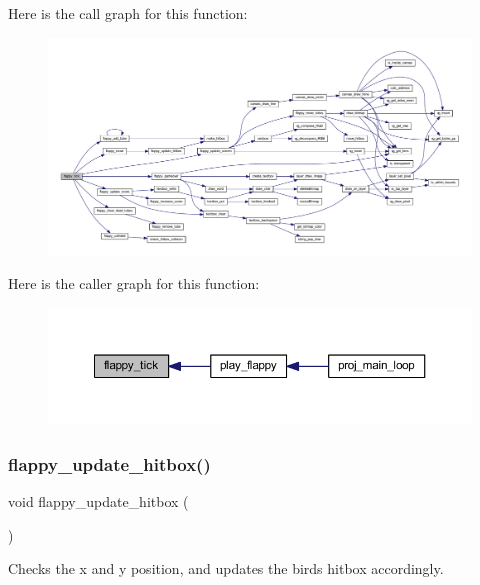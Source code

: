 Here is the call graph for this function\+:\nopagebreak
\begin{figure}[H]
\begin{center}
\leavevmode
\includegraphics[width=350pt]{group__flappy_ga8efa272248ce46f0bb6081dcb680598d_cgraph}
\end{center}
\end{figure}
Here is the caller graph for this function\+:\nopagebreak
\begin{figure}[H]
\begin{center}
\leavevmode
\includegraphics[width=350pt]{group__flappy_ga8efa272248ce46f0bb6081dcb680598d_icgraph}
\end{center}
\end{figure}
\mbox{\label{group__flappy_ga890241c4d6c50c4a9a15c9b3ac9d0c1a}} 
\subsubsection{\texorpdfstring{flappy\+\_\+update\+\_\+hitbox()}{flappy\_update\_hitbox()}}
{\footnotesize\ttfamily void flappy\+\_\+update\+\_\+hitbox (\begin{DoxyParamCaption}{ }\end{DoxyParamCaption})}



Checks the x and y position, and updates the bird\textquotesingle{}s hitbox accordingly. 

